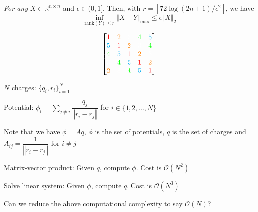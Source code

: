 \documentclass{article}
\newcommand{\magn}[1]{\left\Vert #1 \right\Vert}
\newcommand{\bkt}[1]{\left(#1\right)}
\newcommand{\Rb}{\mathbb{R}}
\newcommand{\dsum}{\displaystyle\sum}
\newcommand{\cntr}[1]{\begin{center}#1\end{center}\vspace{1em}}
\begin{document}
	\large
	\begin{center}
	\emph{For any} $X \in \Rb^{n \times n}$ and $\epsilon \in (0,1]$. Then, with $r= \left\lceil 72\log(2n+1)/\epsilon^2\right\rceil$, we have
	$$\inf_{\text{rank}\bkt{Y} \leq r} \magn{X-Y}_{\max} \leq \epsilon \magn{X}_2$$
	\end{center}
	\newpage
	\begin{center}
		$$\begin{bmatrix}
		\color{red}{1} & \color{orange}{2} & \color{white}{3} & \color{green}{4} & \color{cyan}{5}\\
		\color{cyan}{5} & \color{red}{1} & \color{orange}{2} & \color{white}{3} & \color{green}{4}\\
		\color{green}{4} & \color{cyan}{5} & \color{red}{1} & \color{orange}{2} & \color{white}{3}\\
		\color{white}{3} & \color{green}{4} & \color{cyan}{5} & \color{red}{1} & \color{orange}{2}\\
		\color{orange}{2} & \color{white}{3} & \color{green}{4} & \color{cyan}{5} & \color{red}{1}\\
		\end{bmatrix}$$
	\end{center}
	\newpage
	
	\LARGE
	\cntr{$N$ charges: $\{q_i,r_i\}_{i=1}^N$}
	\cntr{Potential: $\phi_i = \dsum_{j \neq i} \dfrac{q_j}{\magn{r_i-r_j}}$ for $i \in \{1,2,\ldots,N\}$}
	\cntr{Note that we have $\phi = Aq$, $\phi$ is the set of potentials, $q$ is the set of charges and $A_{ij} = \dfrac1{\magn{r_i-r_j}}$ for $i \neq j$}
	\cntr{Matrix-vector product: Given $q$, compute $\phi$. Cost is $\mathcal{O}(N^2)$}
	\cntr{Solve linear system: Given $\phi$, compute $q$. Cost is $\mathcal{O}(N^3)$}
	\cntr{Can we reduce the above computational complexity to say $\mathcal{O}(N)$?}
	
\end{document}
